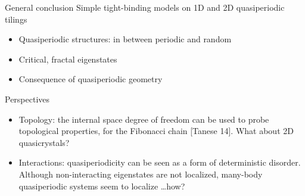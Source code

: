 \begin{frame}{General conclusion}
Simple tight-binding models on 1D and 2D quasiperiodic tilings
\begin{itemize}
	\item Quasiperiodic structures: in between periodic and random
	\item Critical, fractal eigenstates
	\item Consequence of quasiperiodic geometry
\end{itemize}
Perspectives
\begin{itemize}
	\item Topology: the internal space degree of freedom can be used to probe topological properties, for the Fibonacci chain [Tanese \etal{} 14]. What about 2D quasicrystals?
	\item Interactions: quasiperiodicity can be seen as a form of deterministic disorder. Although non-interacting eigenstates are not localized, many-body quasiperiodic systems seem to localize \dots how?
\end{itemize}
\end{frame}